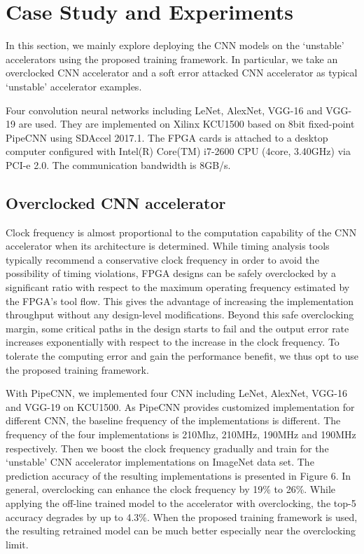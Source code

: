 \section{Case Study and Experiments} \label{sec:casestudy}
  In this section, we mainly explore deploying the CNN models on the ‘unstable’ accelerators 
using the proposed training framework. In particular, we take an overclocked CNN accelerator 
and a soft error attacked CNN accelerator as typical ‘unstable’ accelerator examples.

  Four convolution neural networks including LeNet, AlexNet, VGG-16 and VGG-19 are used.
They are implemented on Xilinx KCU1500 based on 8bit fixed-point PipeCNN using SDAccel 2017.1. 
The FPGA cards is attached to a desktop computer configured with Intel(R) Core(TM) i7-2600 
CPU (4core, 3.40GHz) via PCI-e 2.0. The communication bandwidth is 8GB/s.

\subsection{Overclocked CNN accelerator}
  Clock frequency is almost proportional to the computation capability of the CNN accelerator 
when its architecture is determined. While timing analysis tools typically recommend a 
conservative clock frequency in order to avoid the possibility of timing violations, 
FPGA designs can be safely overclocked by a significant ratio with respect to the maximum 
operating frequency estimated by the FPGA’s tool flow. This gives the advantage of increasing 
the implementation throughput without any design-level modifications. Beyond this safe overclocking 
margin, some critical paths in the design starts to fail and the output error rate increases 
exponentially with respect to the increase in the clock frequency. To tolerate the computing 
error and gain the performance benefit, we thus opt to use the proposed training framework.  

  With PipeCNN, we implemented four CNN including LeNet, AlexNet, VGG-16 and VGG-19 on KCU1500. 
As PipeCNN provides customized implementation for different CNN, the baseline frequency of the implementations 
is different. The frequency of the four implementations is 210Mhz, 210MHz, 190MHz and 190MHz respectively. 
Then we boost the clock frequency gradually and train for the ‘unstable’ CNN accelerator implementations on 
ImageNet data set.  The prediction accuracy of the resulting implementations is presented in Figure 6. In general, 
overclocking can enhance the clock frequency by 19\% to 26\%. While applying the off-line trained model 
to the accelerator with overclocking, the top-5 accuracy degrades by up to 4.3\%. When the proposed training 
framework is used, the resulting retrained model can be much better especially near the overclocking limit.

